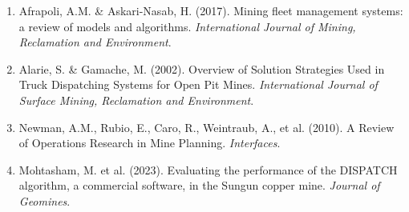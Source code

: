 \documentclass[12pt,a4paper]{article}
\begin{document}
\begin{enumerate}
    \item Afrapoli, A.M. \& Askari-Nasab, H. (2017). Mining fleet management systems: a review of models and algorithms. \textit{International Journal of Mining, Reclamation and Environment}.
    
    \item Alarie, S. \& Gamache, M. (2002). Overview of Solution Strategies Used in Truck Dispatching Systems for Open Pit Mines. \textit{International Journal of Surface Mining, Reclamation and Environment}.
    
    \item Newman, A.M., Rubio, E., Caro, R., Weintraub, A., et al. (2010). A Review of Operations Research in Mine Planning. \textit{Interfaces}.
    
    \item Mohtasham, M. et al. (2023). Evaluating the performance of the DISPATCH algorithm, a commercial software, in the Sungun copper mine. \textit{Journal of Geomines}.
\end{enumerate}

\vfill
\end{document}
